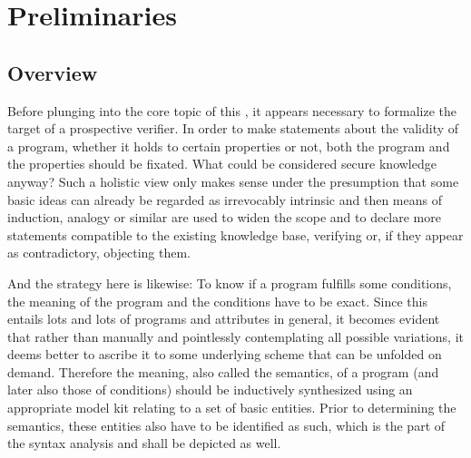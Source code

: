 \chapter{Preliminaries}

\section{Overview}

Before plunging into the core topic of this \paper{}, it appears necessary to formalize the target of a prospective verifier. In order to make statements about the validity of a program, whether it holds to certain properties or not, both the program and the properties should be fixated. What could be considered secure knowledge anyway? Such a holistic view only makes sense under the presumption that some basic ideas can already be regarded as irrevocably intrinsic and then means of induction, analogy or similar are used to widen the scope and to declare more statements compatible to the existing knowledge base, verifying or, if they appear as contradictory, objecting them.

And the strategy here is likewise: To know if a program fulfills some conditions, the meaning of the program and the conditions have to be exact. Since this entails lots and lots of programs and attributes in general, it becomes evident that rather than manually and pointlessly contemplating all possible variations, it deems better to ascribe it to some underlying scheme that can be unfolded on demand. Therefore the meaning, also called the semantics, of a program (and later also those of conditions) should be inductively synthesized using an appropriate model kit relating to a set of basic entities. Prior to determining the semantics, these entities also have to be identified as such, which is the part of the syntax analysis and shall be depicted as well.

